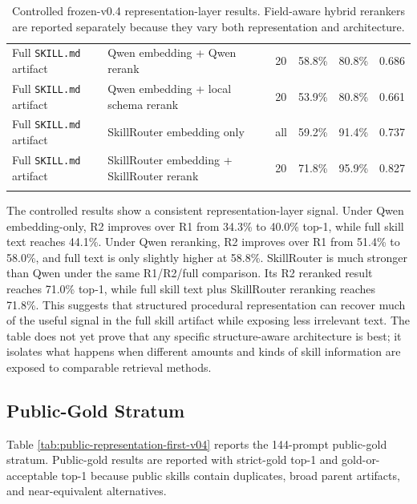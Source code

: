 {\begin{longtable}{@{}p{}p{}p{}rrr@{}}
Full \texttt{SKILL.md} artifact & Qwen embedding + Qwen rerank & 20 & 58.8\% & 80.8\% & 0.686 \\
Full \texttt{SKILL.md} artifact & Qwen embedding + local schema rerank & 20 & 53.9\% & 80.8\% & 0.661 \\
Full \texttt{SKILL.md} artifact & SkillRouter embedding only & all & 59.2\% & 91.4\% & 0.737 \\
Full \texttt{SKILL.md} artifact & SkillRouter embedding + SkillRouter rerank & 20 & 71.8\% & 95.9\% & 0.827 \\
\caption{Controlled frozen-v0.4 representation-layer results. Field-aware hybrid rerankers are reported separately because they vary both representation and architecture.}
\label{tab:controlled-representation-first-v04}
\end{longtable}
}

The controlled results show a consistent representation-layer signal. Under Qwen embedding-only, R2 improves over R1 from 34.3\% to 40.0\% top-1, while full skill text reaches 44.1\%. Under Qwen reranking, R2 improves over R1 from 51.4\% to 58.0\%, and full text is only slightly higher at 58.8\%. SkillRouter is much stronger than Qwen under the same R1/R2/full comparison. Its R2 reranked result reaches 71.0\% top-1, while full skill text plus SkillRouter reranking reaches 71.8\%. This suggests that structured procedural representation can recover much of the useful signal in the full skill artifact while exposing less irrelevant text. The table does not yet prove that any specific structure-aware architecture is best; it isolates what happens when different amounts and kinds of skill information are exposed to comparable retrieval methods.

\subsection{Public-Gold Stratum}

Table \ref{tab:public-representation-first-v04} reports the 144-prompt public-gold stratum. Public-gold results are reported with strict-gold top-1 and gold-or-acceptable top-1 because public skills contain duplicates, broad parent artifacts, and near-equivalent alternatives.

